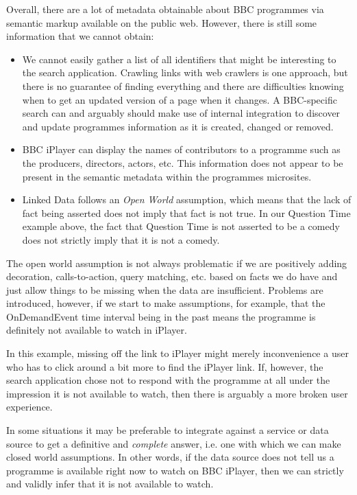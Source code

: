 Overall, there are a lot of metadata obtainable about BBC
programmes via semantic markup available on the public web.
However, there is
still some information that we cannot obtain:

\begin{itemize}
  \item We cannot easily gather a list of all identifiers that might
    be interesting to the search application. Crawling links with
    web crawlers is one approach, but there is no guarantee of finding
    everything and there are difficulties knowing when to get an
    updated version of a page when it changes. A BBC-specific
    search can and arguably should make use of internal integration
    to discover and update programmes information as it is created,
    changed or removed.
  \item BBC iPlayer can display the names of contributors to a programme
    such as the producers, directors, actors, etc. This information
    does not appear to be present in the semantic metadata within
    the programmes microsites.
  \item Linked Data follows an \emph{Open World} assumption,
    which means that the lack of fact being asserted does not imply
    that fact is not true. In our Question Time example above, the
    fact that Question Time is not asserted to be a comedy does not
    strictly imply that it is not a comedy.
\end{itemize}


The open world assumption is not always problematic
if we are positively adding
decoration, calls-to-action, query matching, etc. based on
facts we do have and just allow things to be missing when
the data are insufficient. Problems are introduced, however,
if we start to make assumptions, for example, that the
OnDemandEvent time interval being in the past means the
programme is definitely not available to watch in iPlayer.

In this example, missing off the link to iPlayer might merely
inconvenience a user who has to click around a bit more to
find the iPlayer link. If, however, the search application
chose not to respond with the programme at all under the
impression it is not available to watch, then there is
arguably a more broken user experience.

In some situations it may be preferable to integrate against
a service or data source to get a definitive and \emph{complete}
answer, i.e. one with which we can make closed world assumptions.
In other words, if the data source does not tell us a programme
is available right now to watch on BBC iPlayer, then we can
strictly and validly infer that it is not available to watch.

